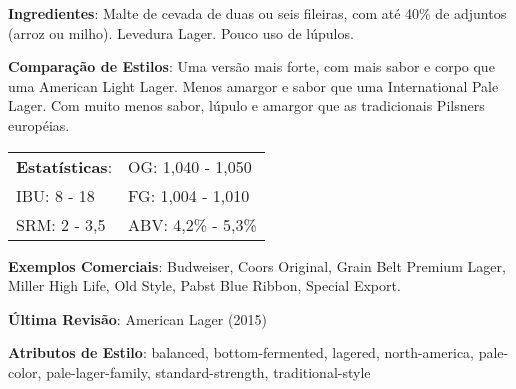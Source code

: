 \textbf{Ingredientes}: Malte de cevada de duas ou seis fileiras, com até 40\% de adjuntos (arroz ou milho). Levedura Lager. Pouco uso de lúpulos.

\textbf{Comparação de Estilos}: Uma versão mais forte, com mais sabor e corpo que uma American Light Lager. Menos amargor e sabor que uma International Pale Lager. Com muito menos sabor, lúpulo e amargor que as tradicionais Pilsners européias.

\begin{tabular}{@{}p{35mm}p{35mm}@{}}
  \textbf{Estatísticas}: & OG: 1,040 - 1,050 \\
  IBU: 8 - 18  & FG: 1,004 - 1,010 \\
  SRM: 2 - 3,5  & ABV: 4,2\% - 5,3\%
\end{tabular}

\textbf{Exemplos Comerciais}: Budweiser, Coors Original, Grain Belt Premium Lager, Miller High Life, Old Style, Pabst Blue Ribbon, Special Export.

\textbf{Última Revisão}: American Lager (2015)

\textbf{Atributos de Estilo}: balanced, bottom-fermented, lagered, north-america, pale-color, pale-lager-family, standard-strength, traditional-style
